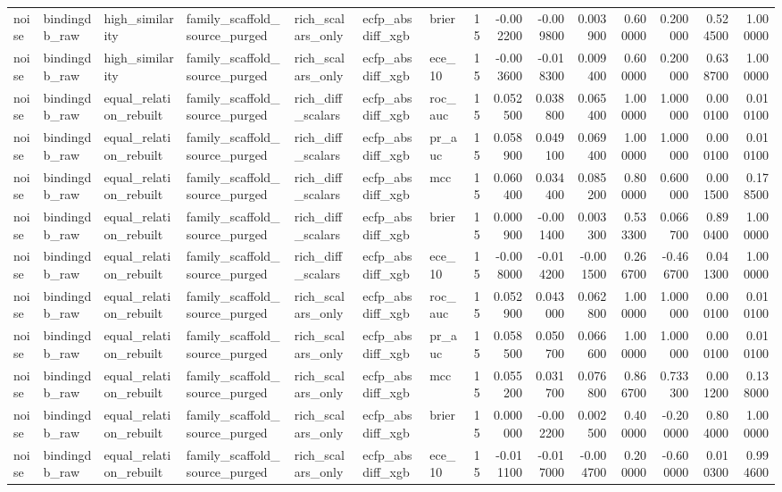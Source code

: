 \begin{longtable}{lllllllrrrrrrrr}
noise & bindingdb\_raw & high\_similarity & family\_scaffold\_source\_purged & rich\_scalars\_only & ecfp\_absdiff\_xgb & brier & 15 & -0.002200 & -0.009800 & 0.003900 & 0.600000 & 0.200000 & 0.524500 & 1.000000 \\
noise & bindingdb\_raw & high\_similarity & family\_scaffold\_source\_purged & rich\_scalars\_only & ecfp\_absdiff\_xgb & ece\_10 & 15 & -0.003600 & -0.018300 & 0.009400 & 0.600000 & 0.200000 & 0.638700 & 1.000000 \\
noise & bindingdb\_raw & equal\_relation\_rebuilt & family\_scaffold\_source\_purged & rich\_diff\_scalars & ecfp\_absdiff\_xgb & roc\_auc & 15 & 0.052500 & 0.038800 & 0.065400 & 1.000000 & 1.000000 & 0.000100 & 0.010100 \\
noise & bindingdb\_raw & equal\_relation\_rebuilt & family\_scaffold\_source\_purged & rich\_diff\_scalars & ecfp\_absdiff\_xgb & pr\_auc & 15 & 0.058900 & 0.049100 & 0.069400 & 1.000000 & 1.000000 & 0.000100 & 0.010100 \\
noise & bindingdb\_raw & equal\_relation\_rebuilt & family\_scaffold\_source\_purged & rich\_diff\_scalars & ecfp\_absdiff\_xgb & mcc & 15 & 0.060400 & 0.034400 & 0.085200 & 0.800000 & 0.600000 & 0.001500 & 0.178500 \\
noise & bindingdb\_raw & equal\_relation\_rebuilt & family\_scaffold\_source\_purged & rich\_diff\_scalars & ecfp\_absdiff\_xgb & brier & 15 & 0.000900 & -0.001400 & 0.003300 & 0.533300 & 0.066700 & 0.890400 & 1.000000 \\
noise & bindingdb\_raw & equal\_relation\_rebuilt & family\_scaffold\_source\_purged & rich\_diff\_scalars & ecfp\_absdiff\_xgb & ece\_10 & 15 & -0.008000 & -0.014200 & -0.001500 & 0.266700 & -0.466700 & 0.041300 & 1.000000 \\
noise & bindingdb\_raw & equal\_relation\_rebuilt & family\_scaffold\_source\_purged & rich\_scalars\_only & ecfp\_absdiff\_xgb & roc\_auc & 15 & 0.052900 & 0.043000 & 0.062800 & 1.000000 & 1.000000 & 0.000100 & 0.010100 \\
noise & bindingdb\_raw & equal\_relation\_rebuilt & family\_scaffold\_source\_purged & rich\_scalars\_only & ecfp\_absdiff\_xgb & pr\_auc & 15 & 0.058500 & 0.050700 & 0.066600 & 1.000000 & 1.000000 & 0.000100 & 0.010100 \\
noise & bindingdb\_raw & equal\_relation\_rebuilt & family\_scaffold\_source\_purged & rich\_scalars\_only & ecfp\_absdiff\_xgb & mcc & 15 & 0.055200 & 0.031700 & 0.076800 & 0.866700 & 0.733300 & 0.001200 & 0.138000 \\
noise & bindingdb\_raw & equal\_relation\_rebuilt & family\_scaffold\_source\_purged & rich\_scalars\_only & ecfp\_absdiff\_xgb & brier & 15 & 0.000000 & -0.002200 & 0.002500 & 0.400000 & -0.200000 & 0.804000 & 1.000000 \\
noise & bindingdb\_raw & equal\_relation\_rebuilt & family\_scaffold\_source\_purged & rich\_scalars\_only & ecfp\_absdiff\_xgb & ece\_10 & 15 & -0.011100 & -0.017000 & -0.004700 & 0.200000 & -0.600000 & 0.010300 & 0.994600 \\
\end{longtable}
